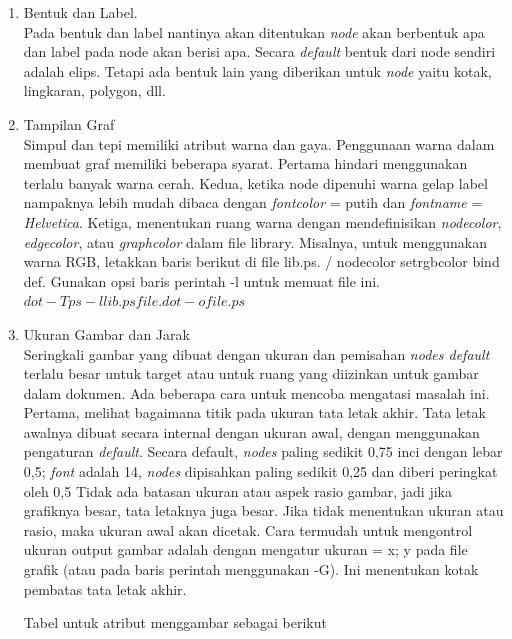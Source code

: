 \begin{enumerate}
\item Bentuk dan Label.\\
Pada bentuk dan label nantinya akan ditentukan \textit{node} akan berbentuk apa dan label pada node akan berisi apa. Secara \textit{default} bentuk dari node sendiri adalah elips. Tetapi ada bentuk lain yang diberikan untuk \textit{node} yaitu kotak, lingkaran, polygon, dll. 
\item Tampilan Graf\\
Simpul dan tepi memiliki atribut warna dan gaya. Penggunaan warna dalam membuat graf memiliki beberapa syarat. Pertama hindari menggunakan terlalu banyak warna cerah. Kedua, ketika node dipenuhi warna gelap label nampaknya lebih mudah dibaca dengan \textit{fontcolor} = putih dan \textit{fontname} = \textit{Helvetica}. Ketiga, menentukan ruang warna dengan mendefinisikan \textit{nodecolor}, \textit{edgecolor}, atau \textit{graphcolor} dalam file library. Misalnya, untuk menggunakan warna RGB, letakkan baris berikut di file lib.ps. / nodecolor {setrgbcolor} bind def. Gunakan opsi baris perintah -l untuk memuat file ini. $ dot -Tps -l lib.ps file.dot -o file.ps $
\item Ukuran Gambar dan Jarak\\
Seringkali gambar yang dibuat dengan ukuran dan pemisahan \textit{nodes default} terlalu besar untuk target atau untuk ruang yang diizinkan untuk gambar dalam dokumen. Ada beberapa cara untuk mencoba mengatasi masalah ini. Pertama, melihat bagaimana titik pada ukuran tata letak akhir. Tata letak awalnya dibuat secara internal dengan ukuran awal, dengan menggunakan pengaturan \textit{default}. Secara default, \textit{nodes} paling sedikit 0,75 inci dengan lebar 0,5; \textit{font} adalah 14, \textit{nodes} dipisahkan paling sedikit 0,25 dan diberi peringkat oleh 0,5 Tidak ada batasan ukuran atau aspek rasio gambar, jadi jika grafiknya besar, tata letaknya juga besar. Jika tidak menentukan ukuran atau rasio, maka ukuran awal akan dicetak. Cara termudah untuk mengontrol ukuran output gambar adalah dengan mengatur ukuran = x; y pada file grafik (atau pada baris perintah menggunakan -G). Ini menentukan kotak pembatas tata letak akhir. 

Tabel untuk atribut menggambar sebagai berikut
\begin{enumerate}


\end{enumerate}
\end{enumerate}
